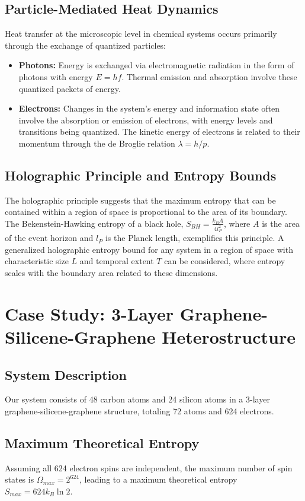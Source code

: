 \documentclass{article}
\begin{document}
	\subsection{Particle-Mediated Heat Dynamics}
	Heat transfer at the microscopic level in chemical systems occurs primarily through the exchange of quantized particles:
	\begin{itemize}
		\item \textbf{Photons:} Energy is exchanged via electromagnetic radiation in the form of photons with energy $E = h f$. Thermal emission and absorption involve these quantized packets of energy.
		\item \textbf{Electrons:} Changes in the system's energy and information state often involve the absorption or emission of electrons, with energy levels and transitions being quantized. The kinetic energy of electrons is related to their momentum through the de Broglie relation $\lambda = h/p$.
		\end{itemize}
		
		\subsection{Holographic Principle and Entropy Bounds}
		The holographic principle suggests that the maximum entropy that can be contained within a region of space is proportional to the area of its boundary. The Bekenstein-Hawking entropy of a black hole, $S_{BH} = \frac{k_B A}{4 l_P^2}$, where $A$ is the area of the event horizon and $l_P$ is the Planck length, exemplifies this principle. A generalized holographic entropy bound for any system in a region of space with characteristic size $L$ and temporal extent $T$ can be considered, where entropy scales with the boundary area related to these dimensions.
		
		\section{Case Study: 3-Layer Graphene-Silicene-Graphene Heterostructure}
		
		\subsection{System Description}
		Our system consists of 48 carbon atoms and 24 silicon atoms in a 3-layer graphene-silicene-graphene structure, totaling 72 atoms and 624 electrons.
		
		\subsection{Maximum Theoretical Entropy}
		Assuming all 624 electron spins are independent, the maximum number of spin states is $\Omega_{max} = 2^{624}$, leading to a maximum theoretical entropy $S_{max} = 624 k_B \ln 2$.
		
\end{document}
